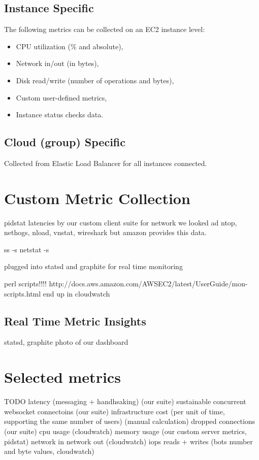 \documentclass{uvamscse}
\begin{document}
\subsection{Instance Specific}
The following metrics can be collected on an EC2 instance level:
\begin{itemize}
  \item CPU utilization (\% and absolute),
  \item Network in/out (in bytes),
  \item Disk read/write (number of operations and bytes),
  \item Custom user-defined metrics,
  \item Instance status checks data.
\end{itemize}

\subsection{Cloud (group) Specific}
Collected from Elastic Load Balancer for all instances connected.

\section{Custom Metric Collection} \label{Custom Metric Collection}
pidstat
latencies by our custom client suite
for network we looked ad ntop, nethogs, nload, vnstat, wireshark but amazon provides this data.

ss -s
netstat -s

plugged into statsd and graphite for real time monitoring

perl scripts!!!!
http://docs.aws.amazon.com/AWSEC2/latest/UserGuide/mon-scripts.html
end up in cloudwatch


\subsection{Real Time Metric Insights} \label{Real Time Metric Insights}
statsd, graphite
photo of our dashboard

\section{Selected metrics}\label{Selected metrics}
TODO
latency (messaging + handhsaking) (our suite)
sustainable concurrent websocket connectoins (our suite)
infrastructure cost (per unit of time, supporting the same number of users) (manual calculation)
dropped connections (our suite)
cpu usage (cloudwatch)
memory usage (our custom server metrics, pidstat)
network in network out (cloudwatch)
iops reads + writes (bots number and byte values, cloudwatch)
\end{document}
